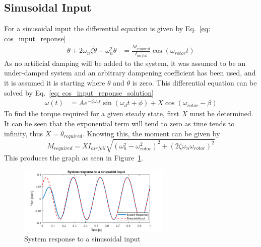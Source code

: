             \subsection{Sinusoidal Input}
                For a sinusoidal input the differential equation is given by Eq.~\ref*{eq: cos_input_reponse}
                \begin{align}
                    \ddot{\theta} +2\omega_{n}\zeta\dot{\theta} + \omega _{n}^2 \theta &= \frac{M_{required}}{I_{airfoil}}\cos(\omega_{rotor} t) \label{eq: cos_input_reponse}
                \end{align}
                As no artificial damping will be added to the system, it was assumed to be an under-damped system and an arbitrary dampening coefficient has been used, and it is assumed it is starting where \(\theta\) and \(\dot{\theta}\) is zero. This differential equation can be solved by Eq.~\ref{eq: cos_input_reponse_solution}
                \begin{align}
                    \omega(t) &= Ae^{-\zeta \omega_{n} t}\sin(\omega_d t + \phi) + X\cos (\omega_{rotor} - \beta) \label{eq: cos_input_reponse_solution}
                \end{align}
                \vspace*{-2mm}
                To find the torque required for a given steady state, first \(X\) must be determined. It can be seen that the exponential term will tend to zero as time tends to infinity, thus \(X = \theta_{required}\). Knowing this, the moment can be given by \[M_{required} = XI_{airfoil} \sqrt{\left(\omega_{n}^2 - \omega_{rotor}^2\right)^2 + \left(2 \zeta \omega_{n} \omega_{rotor}\right)^2}\] This produces the graph as seen in Figure~\ref{fig: cos_response}.
                \begin{figure}
                    \centering
                    \includegraphics*[width = 0.65\textwidth]{figs/Model/Pitch/System_response _for _sinusoidal_input.png}
                    \caption{System response to a sinusoidal input}
                    \label{fig: cos_response}
                \end{figure}

